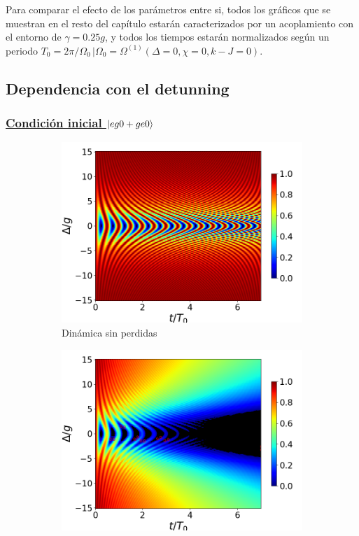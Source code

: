 Para comparar el efecto de los parámetros entre si, todos los gráficos que se muestran en el resto del capítulo estarán caracterizados por un acoplamiento con el entorno de $\gamma=0.25g$, y todos los tiempos estarán normalizados según un periodo $T_0=2\pi/\Omega_0 \, | \Omega_0=\Omega^{(1)}(\Delta=0,\chi=0,k-J=0)$.
\subsection{Dependencia con el detunning}
\subsubsection{\underline{Condición inicial $\ket{eg0+ge0}$}}
\begin{figure}[h]
    \centering
    \begin{subfigure}{0.49\textwidth}
        \includegraphics[width=\textwidth]{figuras/ch4/concu/delta/eg0+ge0 k=0.0g x=0.0g J=0.0g gamma=0.25g concu delta uni.png}
        \caption{Dinámica sin perdidas}
        \label{fig4:concu detunning 0 uni}
    \end{subfigure}
    \hfill
    \begin{subfigure}{0.49\textwidth}
        \includegraphics[width=\textwidth]{figuras/ch4/concu/delta/eg0+ge0 k=0.0g x=0.0g J=0.0g gamma=0.25g concu delta dis.png}

\end{subfigure}
\end{figure}
